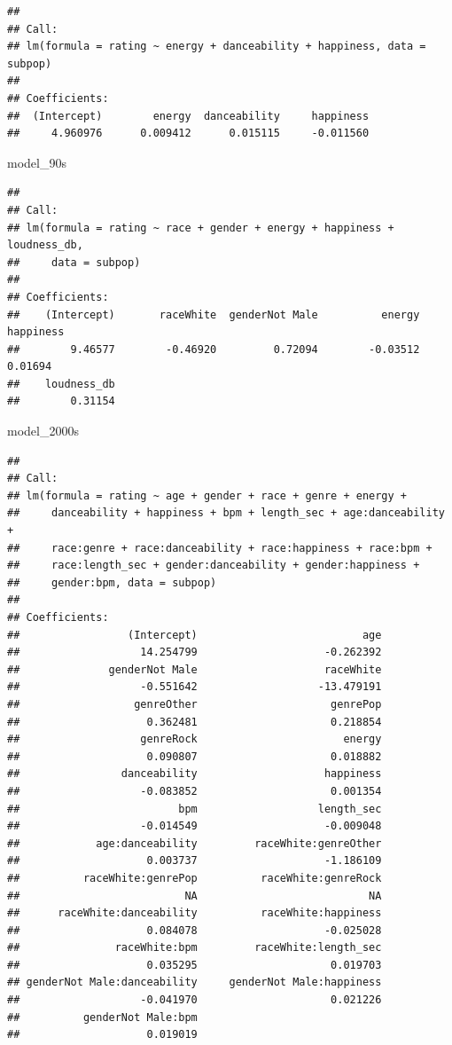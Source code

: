 \documentclass[
]{article}
\newenvironment{Shaded}{\begin{snugshade}}{\end{snugshade}}
\newcommand{\NormalTok}[1]{#1}
\begin{document}
\begin{verbatim}
## 
## Call:
## lm(formula = rating ~ energy + danceability + happiness, data = subpop)
## 
## Coefficients:
##  (Intercept)        energy  danceability     happiness  
##     4.960976      0.009412      0.015115     -0.011560
\end{verbatim}

\begin{Shaded}
\begin{Highlighting}[]
\NormalTok{model\_90s }
\end{Highlighting}
\end{Shaded}

\begin{verbatim}
## 
## Call:
## lm(formula = rating ~ race + gender + energy + happiness + loudness_db, 
##     data = subpop)
## 
## Coefficients:
##    (Intercept)       raceWhite  genderNot Male          energy       happiness  
##        9.46577        -0.46920         0.72094        -0.03512         0.01694  
##    loudness_db  
##        0.31154
\end{verbatim}

\begin{Shaded}
\begin{Highlighting}[]
\NormalTok{model\_2000s }
\end{Highlighting}
\end{Shaded}

\begin{verbatim}
## 
## Call:
## lm(formula = rating ~ age + gender + race + genre + energy + 
##     danceability + happiness + bpm + length_sec + age:danceability + 
##     race:genre + race:danceability + race:happiness + race:bpm + 
##     race:length_sec + gender:danceability + gender:happiness + 
##     gender:bpm, data = subpop)
## 
## Coefficients:
##                 (Intercept)                          age  
##                   14.254799                    -0.262392  
##              genderNot Male                    raceWhite  
##                   -0.551642                   -13.479191  
##                  genreOther                     genrePop  
##                    0.362481                     0.218854  
##                   genreRock                       energy  
##                    0.090807                     0.018882  
##                danceability                    happiness  
##                   -0.083852                     0.001354  
##                         bpm                   length_sec  
##                   -0.014549                    -0.009048  
##            age:danceability         raceWhite:genreOther  
##                    0.003737                    -1.186109  
##          raceWhite:genrePop          raceWhite:genreRock  
##                          NA                           NA  
##      raceWhite:danceability          raceWhite:happiness  
##                    0.084078                    -0.025028  
##               raceWhite:bpm         raceWhite:length_sec  
##                    0.035295                     0.019703  
## genderNot Male:danceability     genderNot Male:happiness  
##                   -0.041970                     0.021226  
##          genderNot Male:bpm  
##                    0.019019
\end{verbatim}
\end{document}
